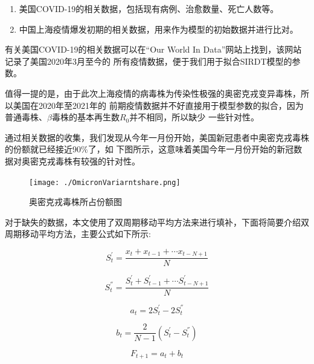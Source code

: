 \documentclass[bwprint]{gmcmthesis}
\numberwithin{figure}{section}
\begin{document}
\begin{enumerate}
    \item 美国COVID-19的相关数据，包括现有病例、治愈数量、死亡人数等。
    \item 中国上海疫情爆发初期的相关数据，用来作为模型的初始数据并进行比对。
\end{enumerate}

\par 有关美国COVID-19的相关数据可以在“Our World In Data”网站上找到，该网站记录了美国2020年3月至今的
所有疫情数据，便于我们用于拟合SIRDT模型的参数。

\par 值得一提的是，由于此次上海疫情的病毒株为传染性极强的奥密克戎变异毒株，所以美国在2020年至2021年的
前期疫情数据并不好直接用于模型参数的拟合，因为普通毒株、$\beta$毒株的基本再生数$R_0$并不相同，所以缺少
一些针对性。

\par 通过相关数据的收集，我们发现从今年一月份开始，美国新冠患者中奥密克戎毒株的份额就已经接近90$\%$了，如
下图所示，这意味着美国今年一月份开始的新冠数据对奥密克戎毒株有较强的针对性。

\begin{figure}[!h]
    \centering
    \texttt{[image: ./OmicronVariarntshare.png]}
    \caption{奥密克戎毒株所占份额图}
    \label{fig1}
\end{figure}

\par 对于缺失的数据，本文使用了双周期移动平均方法来进行填补，下面将简要介绍双周期移动平均方法，主要公式如下所示:

\begin{equation}
    S_{t}^{'}=\dfrac{x_t+x_{t-1}+\cdots x_{t-N+1}}{N}
\end{equation}

\begin{equation}
    S_{t}^{''}=\dfrac{S_{t}^{'}+S_{t-1}^{'}+\cdots S_{t-N+1}^{'}}{N}
\end{equation}

\begin{equation}
    a_t=2S_{t}^{'}-2S_{t}^{''}
\end{equation}

\begin{equation}
    b_t=\dfrac{2}{N-1}\left( S_{t}^{'}-S_{t}^{''} \right) 
\end{equation}

\begin{equation}
    F_{t+1}=a_t+b_t
\end{equation}
\end{document}
